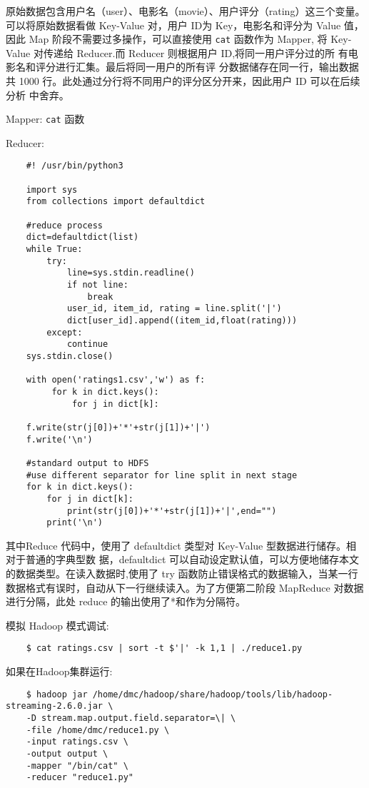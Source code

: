 原始数据包含用户名（user）、电影名（movie）、用户评分（rating）这三个变量。可以将原始数据看做 Key-Value 对，用户 ID为 Key，电影名和评分为 Value 值，因此 Map 阶段不需要过多操作，可以直接使用
\lstinline|cat| 函数作为 Mapper, 将 Key-Value 对传递给 Reducer.而 Reducer
则根据用户 ID,将同一用户评分过的所
有电影名和评分进行汇集。最后将同一用户的所有评
分数据储存在同一行，输出数据 共 1000
行。此处通过分行将不同用户的评分区分开来，因此用户 ID 可以在后续分析
中舍弃。

Mapper: \lstinline|cat| 函数

Reducer:

\begin{lstlisting}
	#! /usr/bin/python3

	import sys
	from collections import defaultdict

	#reduce process
	dict=defaultdict(list)
	while True:
	    try:
	        line=sys.stdin.readline()
	        if not line:
	            break
	        user_id, item_id, rating = line.split('|')
	        dict[user_id].append((item_id,float(rating)))
	    except:
	        continue
	sys.stdin.close()

	with open('ratings1.csv','w') as f:
	     for k in dict.keys():
	         for j in dict[k]:

	f.write(str(j[0])+'*'+str(j[1])+'|')
	f.write('\n')

	#standard output to HDFS
	#use different separator for line split in next stage
	for k in dict.keys():
	    for j in dict[k]:
	        print(str(j[0])+'*'+str(j[1])+'|',end="")
	    print('\n')
\end{lstlisting}

其中Reduce 代码中，使用了 defaultdict 类型对 Key-Value
型数据进行储存。相对于普通的字典型数 据，defaultdict
可以自动设定默认值，可以方便地储存本文的数据类型。在读入数据时,使用了
try
函数防止错误格式的数据输入，当某一行数据格式有误时，自动从下一行继续读入。为了方便第二阶段
MapReduce 对数据进行分隔，此处 reduce
的输出使用了*和\textbar{}作为分隔符。

模拟 Hadoop 模式调试:

\begin{lstlisting}
	$ cat ratings.csv | sort -t $'|' -k 1,1 | ./reduce1.py
\end{lstlisting}

如果在Hadoop集群运行:

\begin{lstlisting}
	$ hadoop jar /home/dmc/hadoop/share/hadoop/tools/lib/hadoop-streaming-2.6.0.jar \
	-D stream.map.output.field.separator=\| \
	-file /home/dmc/reduce1.py \
	-input ratings.csv \
	-output output \
	-mapper "/bin/cat" \
	-reducer "reduce1.py"
\end{lstlisting}

